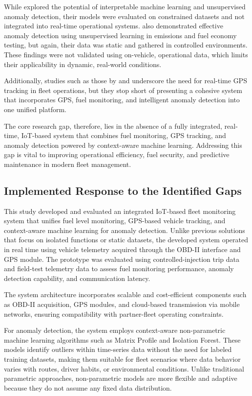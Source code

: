 While \cite{barbado2022interpretable} explored the potential of interpretable machine learning and unsupervised anomaly detection, their models were evaluated on constrained datasets and not integrated into real-time operational systems. \cite{fortela2023unsupervised} also demonstrated effective anomaly detection using unsupervised learning in emissions and fuel economy testing, but again, their data was static and gathered in controlled environments. These findings were not validated using on-vehicle, operational data, which limits their applicability in dynamic, real-world conditions.

Additionally, studies such as those by \cite{joshi2024intelligent} and \cite{nada2017design} underscore the need for real-time GPS tracking in fleet operations, but they stop short of presenting a cohesive system that incorporates GPS, fuel monitoring, and intelligent anomaly detection into one unified platform.

The core research gap, therefore, lies in the absence of a fully integrated, real-time, IoT-based system that combines fuel monitoring, GPS tracking, and anomaly detection powered by context-aware machine learning. Addressing this gap is vital to improving operational efficiency, fuel security, and predictive maintenance in modern fleet management.


\subsection{Implemented Response to the Identified Gaps}

This study developed and evaluated an integrated IoT-based fleet monitoring system that unifies fuel level monitoring, GPS-based vehicle tracking, and context-aware machine learning for anomaly detection. Unlike previous solutions that focus on isolated functions or static datasets, the developed system operated in real time using vehicle telemetry acquired through the OBD-II interface and GPS module. The prototype was evaluated using controlled-injection trip data and field-test telemetry data to assess fuel monitoring performance, anomaly detection capability, and communication latency.

The system architecture incorporates scalable and cost-efficient components such as OBD-II acquisition, GPS modules, and cloud-based transmission via mobile networks, ensuring compatibility with partner-fleet operating constraints.

For anomaly detection, the system employs context-aware non-parametric machine learning algorithms such as \gls{Matrix Profile} and \gls{Isolation Forest}. These models identify outliers within time-series data without the need for labeled training datasets, making them suitable for fleet scenarios where data behavior varies with routes, driver habits, or environmental conditions. Unlike traditional parametric approaches, non-parametric models are more flexible and adaptive because they do not assume any fixed data distribution.

